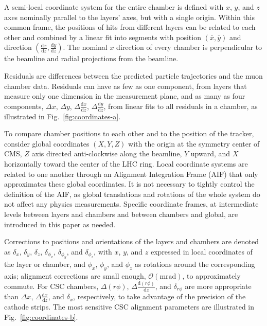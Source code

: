 A semi-local coordinate system for the entire chamber is defined with $x$,
$y$, and $z$ axes nominally parallel to the layers' axes, but with a
single origin.  Within this common frame, the positions of
hits from different layers can be related to each other and combined
by a linear fit into segments with position $(\bar{x}, \bar{y})$
and direction $(\frac{\textrm{d}x}{\textrm{d}z}, \frac{\textrm{d}y}{\textrm{d}z})$.  The nominal $x$
direction of every chamber is perpendicular to the beamline and
radial projections from the beamline.

Residuals are differences between the predicted particle
trajectories and the muon chamber data.  Residuals can have as few as
one component, from layers that measure only one dimension in the
measurement plane, and as many as four components, $\Delta x$, $\Delta y$,
$\Delta \frac{\textrm{d}x}{\textrm{d}z}$, $\Delta \frac{\textrm{d}y}{\textrm{d}z}$, from linear fits to
all residuals in a chamber, as illustrated in
Fig.~\ref{fig:coordinates-a}.

To compare chamber positions to each other and to the position of the
tracker, consider global coordinates $(X, Y, Z)$ with the
origin at the symmetry center of CMS, $Z$ axis directed anti-clockwise along the
beamline, $Y$ upward, and $X$ horizontally toward the center
of the LHC ring.  Local coordinate systems are related to one another
through an Alignment Integration Frame (AIF) that only approximates these
global coordinates.  It is not necessary to tightly control the
definition of the AIF, as global translations
and rotations of the whole system do not affect any physics
measurements.  Specific coordinate frames, at intermediate levels
between layers and chambers and between chambers and global, are
introduced in this paper as needed.

Corrections to positions and orientations of the layers and chambers
are denoted as $\delta_x$, $\delta_y$, $\delta_z$, $\delta_{\phi_x}$,
$\delta_{\phi_y}$, and $\delta_{\phi_z}$, with $x$, $y$, and $z$ expressed in
local coordinates of the layer or chamber, and $\phi_x$, $\phi_y$,
and $\phi_z$ as rotations around the corresponding axis; alignment
corrections are small enough, $\mathcal{O}(\mbox{mrad})$, to
approximately commute.  For CSC chambers, $\Delta(r\phi)$,
$\Delta \frac{\textrm{d}(r\phi)}{\textrm{d}z}$, and $\delta_{r\phi}$
are more appropriate than $\Delta x$,
$\Delta \frac{\textrm{d}x}{\textrm{d}z}$, and $\delta_x$,
respectively, to take advantage of the precision of the cathode
strips.  The most sensitive CSC alignment parameters are illustrated
in Fig.~\ref{fig:coordinates-b}.

